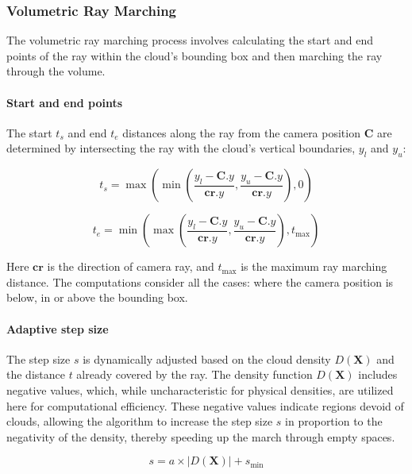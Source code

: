 \subsubsection{Volumetric Ray Marching}

The volumetric ray marching process involves calculating the start and end points of the ray within the cloud's bounding box and then marching the ray through the volume.

\paragraph{Start and end points}

The start $t_s$ and end $t_e$ distances along the ray from the camera position $\mathbf{C}$ are determined by intersecting the ray with the cloud's vertical boundaries, $y_l$ and $y_u$: 

\begin{equation}
    t_s = \max(\min(\frac{y_l - \mathbf{C}.y}{\mathbf{cr}.y}, \frac{y_u - \mathbf{C}.y}{\mathbf{cr}.y}), 0)
\end{equation}

\begin{equation}
    t_e = \min(\max(\frac{y_l - \mathbf{C}.y}{\mathbf{cr}.y}, \frac{y_u - \mathbf{C}.y}{\mathbf{cr}.y}), t_{\text{max}})
\end{equation}

Here $\mathbf{cr}$ is the direction of camera ray, and $t_{\text{max}}$ is the maximum ray marching distance. The computations consider all the cases: where the camera position is below, in or above the bounding box.

\paragraph{Adaptive step size}

The step size $s$ is dynamically adjusted based on the cloud density $D(\mathbf{X})$ and the distance $t$ already covered by the ray. The density function $D(\mathbf{X})$ includes negative values, which, while uncharacteristic for physical densities, are utilized here for computational efficiency. These negative values indicate regions devoid of clouds, allowing the algorithm to increase the step size $s$ in proportion to the negativity of the density, thereby speeding up the march through empty spaces.

\begin{equation}
    s = a \times |D(\mathbf{X})| + s_{\text{min}}
\end{equation}

